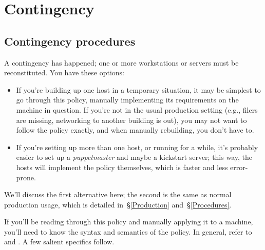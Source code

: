 \chapter{Contingency}
\label{Contingency}

\section{Contingency procedures}

A contingency has happened; one or more workstations or servers
must be reconstituted. You have these options:

\begin{itemize}

\item If you're building up one host in a temporary situation, it may be
simplest to go through this policy, manually implementing its requirements
on the machine in question. If you're not in the usual production setting
(e.g., filers are missing, networking to another building is out), you may
not want to follow the policy exactly, and when manually rebuilding, you
don't have to.

\item If you're setting up more than one host, or running for a while,
it's probably easier to set up a \emph{puppetmaster} and maybe a kickstart
server; this way, the hosts will implement the policy themselves, which is
faster and less error-prone.

\end{itemize}

We'll discuss the first alternative here; the second is the same as normal
production usage, which is detailed in~\S\ref{Production}
and~\S\ref{Procedures}.

If you'll be reading through this policy and manually applying it to a
machine, you'll need to know the syntax and semantics of the policy. In
general, refer to \cite{pro-puppet-book} and
\cite{puppet-generated-references}. A few salient specifics follow.

